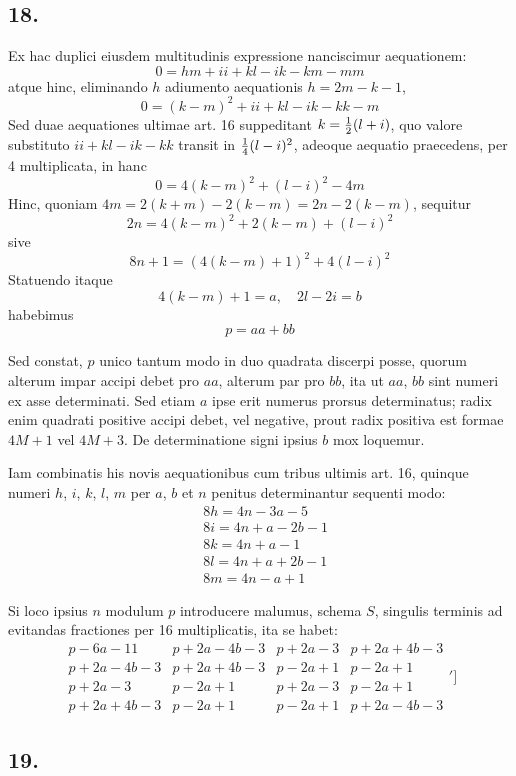 \documentclass[twoside,12pt]{memoir}
\let\oldfrac\frac
\def\frac#1#2{\mathchoice{\tfrac{#1}{#2}}{\oldfrac{#1}{#2}}{\genfrac{}{}{}{2}{#1}{#2\mathstrut}}{\genfrac{}{}{}{3}{#1}{#2\mathstrut}}}
\begin{document}
\subsection*{18.}
 
Ex hac duplici eiusdem multitudinis expressione nanciscimur aequationem:
\[0=h m+i i+k l-i k-k m-m m\]
atque hinc, eliminando \(h\) adiumento aequationis \(h=2 m-k-1\),
\[0=(k-m)^{2}+i i+k l-i k-k k-m\]
Sed duae aequationes ultimae art. 16 suppeditant \(k=\frac{1}{2}(l+i)\), quo valore substituto \(i i+k l-i k-k k\) transit in \(\frac{1}{4}(l-i)^{2}\), adeoque aequatio praecedens, per 4 multiplicata, in hanc
\[0=4(k-m)^{2}+(l-i)^{2}-4 m\]
Hinc, quoniam \(4 m=2(k+m)-2(k-m)=2 n-2(k-m)\), sequitur
\[2 n=4(k-m)^{2}+2(k-m)+(l-i)^{2}\]
sive
\[8 n+1=(4(k-m)+1)^{2}+4(l-i)^{2}\]
Statuendo itaque
\[4(k-m)+1=a,\quad 2 l-2 i=b\]
habebimus
\[p=a a+b b\]

Sed constat, \(p\) unico tantum modo in duo quadrata discerpi posse, quorum alterum impar accipi debet pro \(a a\), alterum par pro \(b b\), ita ut \(a a\), \(b b\) sint numeri ex asse determinati. Sed etiam \(a\) ipse erit numerus prorsus determinatus; radix enim quadrati positive accipi debet, vel negative, prout radix positiva est formae \(4 M+1\) vel \(4 M+3\). De determinatione signi ipsius \(b\) mox loquemur.

Iam combinatis his novis aequationibus cum tribus ultimis art. 16, quinque numeri \(h\), \(i\), \(k\), \(l\), \(m\) per \(a\), \(b\) et \(n\) penitus determinantur sequenti modo:\pagebreak%
\[\begin{aligned}
& 8 h=4 n-3 a-5 \\
& 8 i=4 n+a-2 b-1 \\
& 8 k=4 n+a-1 \\
& 8 l=4 n+a+2 b-1 \\
& 8 m=4 n-a+1
\end{aligned}\]

Si loco ipsius \(n\) modulum \(p\) introducere malumus, schema \({S}\), singulis terminis ad evitandas fractiones per 16 multiplicatis, ita se habet:
\[\begin{array}{l|l|l|l}
p-6 a-11 & p+2 a-4 b-3 & p+2 a-3 & p+2 a+4 b-3 \\
p+2 a-4 b-3 & p+2 a+4 b-3 & p-2 a+1 & p-2 a+1 \\
p+2 a-3 & p-2 a+1 & p+2 a-3 & p-2 a+1 \\
p+2 a+4 b-3 & p-2 a+1 & p-2 a+1 & p+2 a-4 b-3
\end{array}']\]

\subsection*{19.}
 
\end{document}
